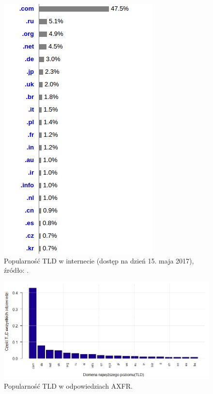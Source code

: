 \begin{center}
	\begin{figure}[h]
		\centering
		\includegraphics[scale=0.75]{image/TLD_all}
		\caption{Popularność TLD w internecie (dostęp na dzień 15. maja 2017), źródło:  \cite{TLD_popularity}.}
		\label{fig:TLD_all}
	\end{figure}
\end{center}

\begin{center}
	\begin{figure}[h]
		\centering
		\includegraphics[width=1.0\textwidth]{image/resp_no_title}
		\caption{Popularność TLD w odpowiedziach AXFR.}
		\label{fig:resp}
	\end{figure}
\end{center}

